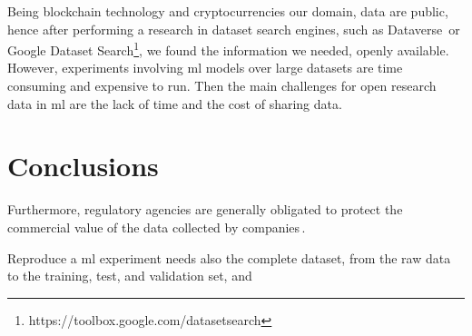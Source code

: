Being blockchain technology and cryptocurrencies our domain,
data are public, hence after performing a research in dataset search engines, such as
Dataverse\,\cite{crosas2011dataverse} or Google Dataset
Search\footnote{https://toolbox.google.com/datasetsearch},
we found the information we needed, openly available. However, experiments involving \ac{ml} models
over large datasets are time consuming and expensive to run. Then the main
challenges for open research data in \ac{ml} are the lack of time and the cost of sharing data.







\section{Conclusions}
Furthermore, regulatory agencies are generally obligated to protect the commercial
value of the data collected by companies\,\cite{national2016principles}.

Reproduce a \ac{ml} experiment needs also the complete dataset, from the raw data to the
training, test, and validation set, and 




